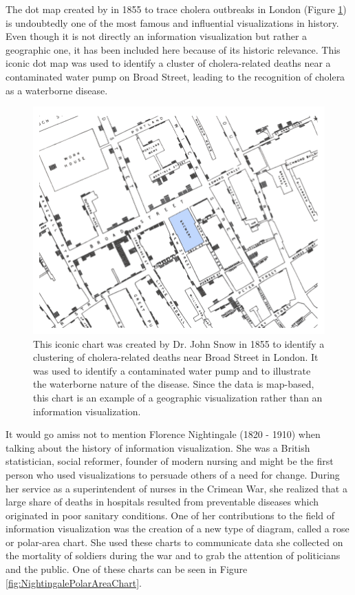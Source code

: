 The dot map created by \cite{ModeOfCommunicationOfCholera} in 1855 to trace cholera outbreaks in London (Figure \ref{fig:CholeraDotMap}) is undoubtedly one of the most famous and influential visualizations in history.
Even though it is not directly an information visualization but rather a geographic one, it has been included here because of its historic relevance.
This iconic dot map was used to identify a cluster of cholera-related deaths near a contaminated water pump on Broad Street, leading to the recognition of cholera as a waterborne disease.

\begin{figure}[tp]
\centering
\includegraphics[keepaspectratio,width=\linewidth,height=\fullh / 3]{images/cholera-dot-map.png}
\caption[Dot Map Plotting Cholera Deaths in London From 1855]{
  This iconic chart was created by Dr. John Snow in 1855 to identify a clustering of cholera-related deaths near Broad Street in London.
  It was used to identify a contaminated water pump and to illustrate the waterborne nature of the disease.
  Since the data is map-based, this chart is an example of a geographic visualization rather than an information visualization.
}
\label{fig:CholeraDotMap}
\end{figure}

It would go amiss not to mention Florence Nightingale (1820 - 1910) \parencite{FlorenceNightingale} when talking about the history of information visualization.
She was a British statistician, social reformer, founder of modern nursing and might be the first person who used visualizations to persuade others of a need for change.
During her service as a superintendent of nurses in the Crimean War, she realized that a large share of deaths in hospitals resulted from preventable diseases which originated in poor sanitary conditions.
One of her contributions to the field of information visualization was the creation of a new type of diagram, called a rose or polar-area chart.
She used these charts to communicate data she collected on the mortality of soldiers during the war and to grab the attention of politicians and the public.
One of these charts can be seen in Figure \ref{fig:NightingalePolarAreaChart}.

